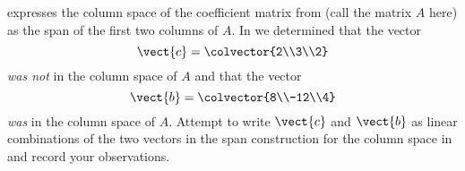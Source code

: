  expresses the column space of the coefficient matrix from  (call the matrix $A$ here) as the span of the first two columns of $A$.  In  we determined that the vector
%
\begin{equation*}
\vect{c}=\colvector{2\\3\\2}
\end{equation*}
%
{\em was not} in the column space of $A$  and that the vector 
%
\begin{equation*}
\vect{b}=\colvector{8\\-12\\4}
\end{equation*}
%
{\em was} in the column space of $A$.   Attempt to write $\vect{c}$ and $\vect{b}$ as linear combinations of the two vectors in the span construction for the column space in  and record your observations.